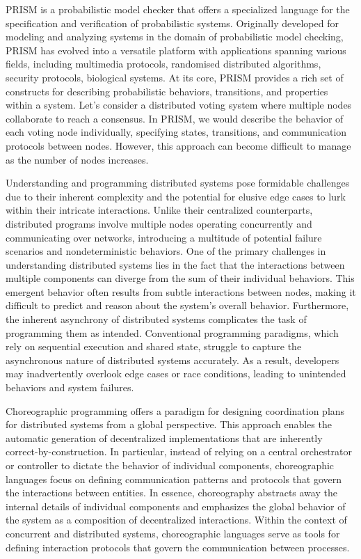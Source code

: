 PRISM \cite{PRISMdoc} is a probabilistic model checker that offers a specialized language for the specification and verification of probabilistic systems. Originally developed for modeling and analyzing systems in the domain of probabilistic model checking, PRISM has evolved into a versatile platform with applications spanning various fields, including multimedia protocols, randomised distributed algorithms, security protocols, biological systems.
At its core, PRISM provides a rich set of constructs for describing probabilistic behaviors, transitions, and properties within a system. 
Let's consider a distributed voting system where multiple nodes collaborate to reach a consensus. In PRISM, we would describe the behavior of each voting node individually, specifying states, transitions, and communication protocols between nodes. However, this approach can become difficult to manage as the number of nodes increases.

Understanding and programming distributed systems pose formidable challenges due to their inherent complexity and the potential for elusive edge cases to lurk within their intricate interactions. Unlike their centralized counterparts, distributed programs involve multiple nodes operating concurrently and communicating over networks, introducing a multitude of potential failure scenarios and nondeterministic behaviors.
One of the primary challenges in understanding distributed systems lies in the fact that the interactions between multiple components can diverge from the sum of their individual behaviors. This emergent behavior often results from subtle interactions between nodes, making it difficult to predict and reason about the system's overall behavior.
Furthermore, the inherent asynchrony of distributed systems complicates the task of programming them as intended. Conventional programming paradigms, which rely on sequential execution and shared state, struggle to capture the asynchronous nature of distributed systems accurately. As a result, developers may inadvertently overlook edge cases or race conditions, leading to unintended behaviors and system failures.

Choreographic programming offers a paradigm for designing coordination plans for distributed systems from a global perspective. This approach enables the automatic generation of decentralized implementations that are inherently correct-by-construction.
In particular, instead of relying on a central orchestrator or controller to dictate the behavior of individual components, choreographic languages focus on defining communication patterns and protocols that govern the interactions between entities.
In essence, choreography abstracts away the internal details of individual components and emphasizes the global behavior of the system as a composition of decentralized interactions. Within the context of concurrent and distributed systems, choreographic languages serve as tools for defining interaction protocols that govern the communication between processes. 


